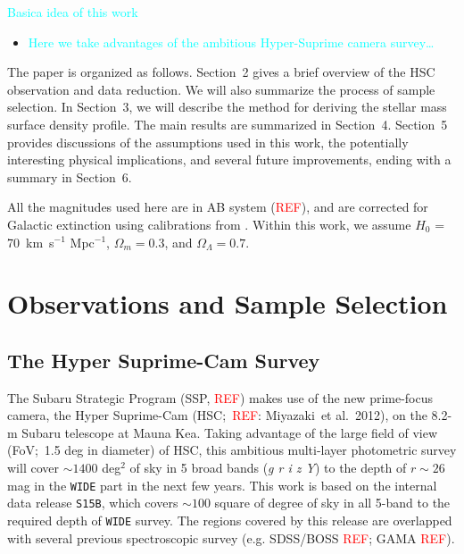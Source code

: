 \documentclass[preprint]{aastex}
\def\etal{{\ et al.~}}
\newcommand{\plan}[1]{\textcolor{cyan}{#1}}
\newcommand{\addref}{{\textcolor{red}{REF}}}
\begin{document}
\begin{CJK*}{UTF8}{gbsn}
    \plan{Basica idea of this work}
    \begin{itemize}
        \item \plan{Here we take advantages of the ambitious Hyper-Suprime camera 
            survey\ldots}
    \end{itemize}

    The paper is organized as follows. Section~2 gives a brief overview of the HSC
    observation and data reduction.  We will also summarize the process of sample
    selection.  In Section~3, we will describe the method for deriving the stellar mass 
    surface density profile.  The main results are summarized in Section~4.  Section~5 
    provides discussions of the assumptions used in this work, the potentially interesting
    physical implications, and several future improvements, ending with a summary in
    Section~6.

    All the magnitudes used here are in AB system (\addref), and are corrected 
    for Galactic extinction using calibrations from \citet{Schlafly11}.
    Within this work, we assume $H_0$ = 70~km~s$^{-1}$ Mpc$^{-1}$, ${\Omega}_m=0.3$, 
    and ${\Omega}_{\Lambda}=0.7$. 
    

\section{Observations and Sample Selection}

\subsection{The Hyper Suprime-Cam Survey}

    The Subaru Strategic Program (SSP, \addref) makes use of the new prime-focus camera,
    the Hyper Suprime-Cam (HSC;~\addref: Miyazaki\etal 2012), on the 8.2-m Subaru
    telescope at Mauna Kea.  
    Taking advantage of the large field of view (FoV;~1.5 deg in diameter) of HSC, this
    ambitious multi-layer photometric survey will cover $\sim 1400$ deg$^2$ of sky in 5
    broad bands (\textit{g r i z Y}) to the depth of $r \sim 26$ mag in the \texttt{WIDE}
    part in the next few years.  
    This work is based on the internal data release \texttt{S15B}, which covers $\sim 100$
    square of degree of sky in all 5-band to the required depth of \texttt{WIDE} survey.  
    The regions covered by this release are overlapped with several previous spectroscopic
    survey (e.g. SDSS/BOSS \addref; GAMA \addref).


\end{CJK*}
\end{document}
